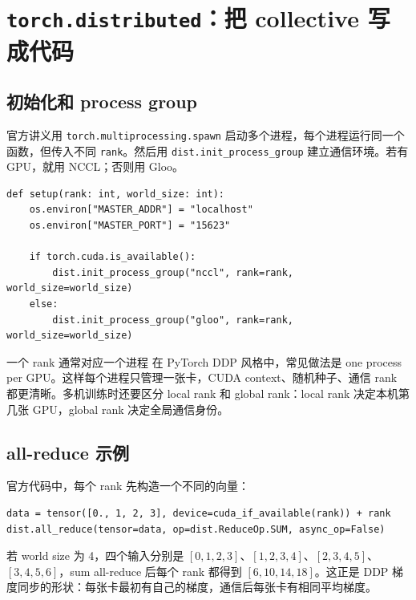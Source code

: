 \documentclass[a4paper]{article}
\newcommand{\code}[1]{\texttt{#1}}
\begin{document}
\section{\texorpdfstring{\code{torch.distributed}}{torch.distributed}：把 collective 写成代码}

\subsection{初始化和 process group}

官方讲义用 \code{torch.multiprocessing.spawn} 启动多个进程，每个进程运行同一个函数，但传入不同 \code{rank}。然后用 \code{dist.init\_process\_group} 建立通信环境。若有 GPU，就用 NCCL；否则用 Gloo。

\begin{lstlisting}[caption={Lecture 7 中分布式初始化的最小结构}]
def setup(rank: int, world_size: int):
    os.environ["MASTER_ADDR"] = "localhost"
    os.environ["MASTER_PORT"] = "15623"

    if torch.cuda.is_available():
        dist.init_process_group("nccl", rank=rank, world_size=world_size)
    else:
        dist.init_process_group("gloo", rank=rank, world_size=world_size)
\end{lstlisting}

\begin{knowledgebox}{一个 rank 通常对应一个进程}
在 PyTorch DDP 风格中，常见做法是 one process per GPU。这样每个进程只管理一张卡，CUDA context、随机种子、通信 rank 都更清晰。多机训练时还要区分 local rank 和 global rank：local rank 决定本机第几张 GPU，global rank 决定全局通信身份。
\end{knowledgebox}

\subsection{all-reduce 示例}

官方代码中，每个 rank 先构造一个不同的向量：

\begin{lstlisting}[caption={all-reduce 会原地修改每个 rank 的 tensor}]
data = tensor([0., 1, 2, 3], device=cuda_if_available(rank)) + rank
dist.all_reduce(tensor=data, op=dist.ReduceOp.SUM, async_op=False)
\end{lstlisting}

若 world size 为 4，四个输入分别是 \([0,1,2,3]\)、\([1,2,3,4]\)、\([2,3,4,5]\)、\([3,4,5,6]\)，sum all-reduce 后每个 rank 都得到 \([6,10,14,18]\)。这正是 DDP 梯度同步的形状：每张卡最初有自己的梯度，通信后每张卡有相同平均梯度。
\end{document}
